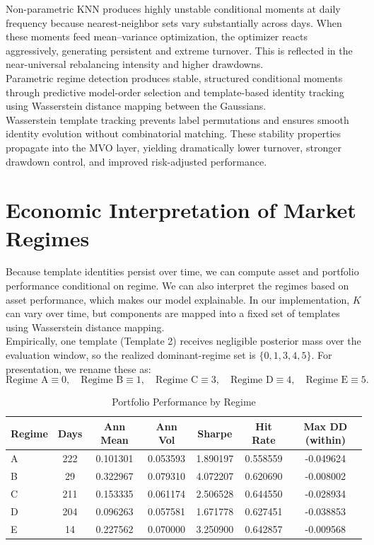 \documentclass[11pt]{article}
\begin{document}
Non-parametric KNN produces highly unstable conditional moments at daily frequency because nearest-neighbor sets vary substantially across days.
When these moments feed mean--variance optimization, the optimizer reacts aggressively, generating persistent and extreme turnover.
This is reflected in the near-universal rebalancing intensity and higher drawdowns.\\
Parametric regime detection produces stable, structured conditional moments through predictive model-order selection and template-based identity tracking using Wasserstein distance mapping between the Gaussians.\\
Wasserstein template tracking prevents label permutations and ensures smooth identity evolution without combinatorial matching.
These stability properties propagate into the MVO layer, yielding dramatically lower turnover, stronger drawdown control, and improved risk-adjusted performance.

\section{Economic Interpretation of Market Regimes}
\label{sec:template_regimes}

Because template identities persist over time, we can compute asset and portfolio performance conditional on regime. We can also interpret the regimes based on asset performance, which makes our model explainable.
In our implementation, $K$ can vary over time, but components are mapped into a fixed set of templates using Wasserstein distance mapping.\\
Empirically, one template (Template 2) receives negligible posterior mass over the evaluation window, so the realized dominant-regime set is
$\{0,1,3,4,5\}$.
For presentation, we rename these as:
\[
\text{Regime A} \equiv 0,\quad
\text{Regime B} \equiv 1,\quad
\text{Regime C} \equiv 3,\quad
\text{Regime D} \equiv 4,\quad
\text{Regime E} \equiv 5.
\]



\begin{table}[H]
\centering
\caption{Portfolio Performance by Regime}
\label{tab:portfolio_by_regime}
\begin{tabular}{lcccccc}
\toprule
Regime & Days & Ann Mean & Ann Vol & Sharpe & Hit Rate & Max DD (within) \\
\midrule
A & 222 & 0.101301 & 0.053593 & 1.890197 & 0.558559 & -0.049624 \\
B & 29  & 0.322967 & 0.079310 & 4.072207 & 0.620690 & -0.008002 \\
C & 211 & 0.153335 & 0.061174 & 2.506528 & 0.644550 & -0.028934 \\
D & 204 & 0.096263 & 0.057581 & 1.671778 & 0.627451 & -0.038853 \\
E & 14  & 0.227562 & 0.070000 & 3.250900 & 0.642857 & -0.009568 \\
\bottomrule
\end{tabular}
\end{table}
\end{document}
